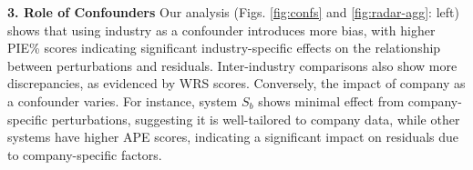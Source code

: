 \noindent\textbf{3. Role of Confounders} 
Our analysis (Figs. \ref{fig:confs} and \ref{fig:radar-agg}: left) shows that using industry as a confounder introduces more bias, with higher PIE\% scores indicating significant industry-specific effects on the relationship between perturbations and residuals. Inter-industry comparisons also show more discrepancies, as evidenced by WRS scores. Conversely, the impact of company as a confounder varies. For instance, system $S_b$ shows minimal effect from company-specific perturbations, suggesting it is well-tailored to company data, while other systems have higher APE scores, indicating a significant impact on residuals due to company-specific factors.


